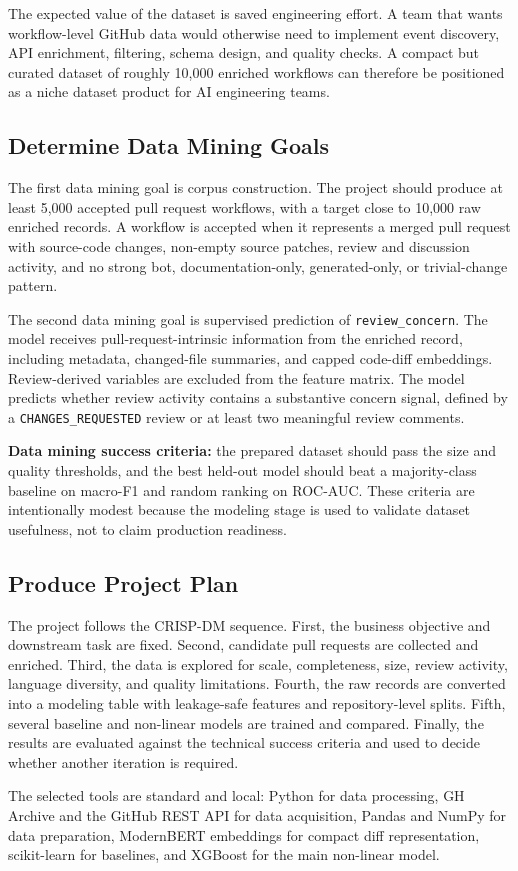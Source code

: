 The expected value of the dataset is saved engineering effort. A team that wants workflow-level GitHub data would otherwise need to implement event discovery, API enrichment, filtering, schema design, and quality checks. A compact but curated dataset of roughly 10,000 enriched workflows can therefore be positioned as a niche dataset product for AI engineering teams.

\subsection{Determine Data Mining Goals}

The first data mining goal is corpus construction. The project should produce at least 5,000 accepted pull request workflows, with a target close to 10,000 raw enriched records. A workflow is accepted when it represents a merged pull request with source-code changes, non-empty source patches, review and discussion activity, and no strong bot, documentation-only, generated-only, or trivial-change pattern.

The second data mining goal is supervised prediction of \texttt{review\_concern}. The model receives pull-request-intrinsic information from the enriched record, including metadata, changed-file summaries, and capped code-diff embeddings. Review-derived variables are excluded from the feature matrix. The model predicts whether review activity contains a substantive concern signal, defined by a \texttt{CHANGES\_REQUESTED} review or at least two meaningful review comments.

\textbf{Data mining success criteria:} the prepared dataset should pass the size and quality thresholds, and the best held-out model should beat a majority-class baseline on macro-F1 and random ranking on ROC-AUC. These criteria are intentionally modest because the modeling stage is used to validate dataset usefulness, not to claim production readiness.

\subsection{Produce Project Plan}

The project follows the CRISP-DM sequence. First, the business objective and downstream task are fixed. Second, candidate pull requests are collected and enriched. Third, the data is explored for scale, completeness, size, review activity, language diversity, and quality limitations. Fourth, the raw records are converted into a modeling table with leakage-safe features and repository-level splits. Fifth, several baseline and non-linear models are trained and compared. Finally, the results are evaluated against the technical success criteria and used to decide whether another iteration is required.

The selected tools are standard and local: Python for data processing, GH Archive and the GitHub REST API for data acquisition, Pandas and NumPy for data preparation, ModernBERT embeddings for compact diff representation, scikit-learn for baselines, and XGBoost for the main non-linear model.
